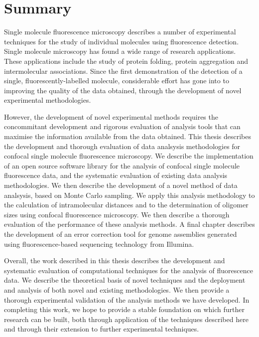 \chapter*{Summary}
Single molecule fluorescence microscopy describes a number of experimental techniques for the study of individual molecules using fluorescence detection. Single molecule microscopy has found a wide range of research applications. These applications include the study of protein folding, protein aggregation and intermolecular associations. Since the first demonstration of the detection of a single, fluorescently-labelled molecule, considerable effort has gone into to improving the quality of the data obtained, through the development of novel experimental methodologies.

However, the development of novel experimental methods requires the concommitant development and rigorous evaluation of analysis tools that can maximise the information available from the data obtained. This thesis describes the development and thorough evaluation of data analsysis methodologies for confocal single molecule fluorescence microscopy. We describe the implementation of an open source software library for the analysis of confocal single molecule fluorescence data, and the systematic evaluation of existing data analysis methodologies. We then describe the development of a novel method of data analsysis, based on Monte Carlo sampling. We apply this analysis methodology to the calculation of intramolecular distances and to the determination of oligomer sizes using confocal fluorescence microscopy. We then describe a thorough evaluation of the performance of these analysis methods. A final chapter describes the development of an error correction tool for genome assemblies generated using fluorescence-based sequencing technology from Illumina.

Overall, the work described in this thesis describes the development and systematic evaluation of computational techniques for the analysis of fluorescence data. We describe the theoretical basis of novel techniques and the deployment and analysis of both novel and existing methodologies. We then provide a thorough experimental validation of the analysis methods we have developed. In completing this work, we hope to provide a stable foundation on which further research can be built, both through application of the techniques described here and through their extension to further experimental techniques.

